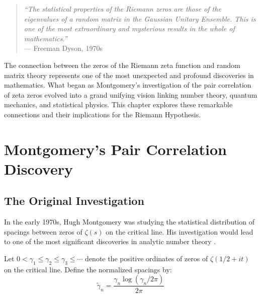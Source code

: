 

\begin{quote}
\textit{``The statistical properties of the Riemann zeros are those of the eigenvalues of a random matrix in the Gaussian Unitary Ensemble. This is one of the most extraordinary and mysterious results in the whole of mathematics.''} \\
--- Freeman Dyson, 1970s
\end{quote}

The connection between the zeros of the Riemann zeta function and random matrix theory represents one of the most unexpected and profound discoveries in mathematics. What began as Montgomery's investigation of the pair correlation of zeta zeros evolved into a grand unifying vision linking number theory, quantum mechanics, and statistical physics. This chapter explores these remarkable connections and their implications for the Riemann Hypothesis.

\section{Montgomery's Pair Correlation Discovery}
\label{sec:montgomery_pair_correlation}

\subsection{The Original Investigation}

In the early 1970s, Hugh Montgomery was studying the statistical distribution of spacings between zeros of $\zeta(s)$ on the critical line. His investigation would lead to one of the most significant discoveries in analytic number theory \cite{montgomery1973}.

\begin{definition}
\label{def:normalized_spacings}
Let $0 < \gamma_1 \leq \gamma_2 \leq \gamma_3 \leq \cdots$ denote the positive ordinates of zeros of $\zeta(1/2 + it)$ on the critical line. Define the normalized spacings by:
\begin{equation}
\tilde{\gamma}_n = \frac{\gamma_n \log(\gamma_n/2\pi)}{2\pi}
\label{eq:normalized_spacings}
\end{equation}
\end{definition}

